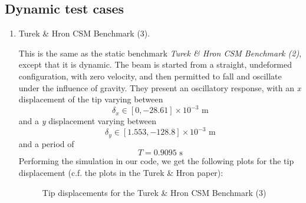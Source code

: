 \documentclass{article}
\begin{document}
\subsection{Dynamic test cases}
\begin{enumerate}
\item Turek \& Hron CSM Benchmark (3).

This is the same as the static benchmark \emph{Turek \& Hron CSM Benchmark (2)}, except that it is dynamic. 
The beam is started from a straight, undeformed configuration, with zero velocity, and then permitted to fall and oscillate under the influence of gravity.
They present an oscillatory response, with an \emph{x} displacement of the tip varying between
\[ \delta_x \in [0,-28.61] \times 10^{-3} \mbox{ m} \]
and a \emph{y} displacement varying between
\[ \delta_y \in [1.553,-128.8] \times 10^{-3} \mbox{ m} \]
and a period of
\[ T = 0.9095 \mbox{ s} \]
Performing the simulation in our code, we get the following plots for the tip displacement (c.f. the plots in the Turek \& Hron paper):
\begin{figure}[ht]
        \centering
        \caption{Tip displacements for the Turek \& Hron CSM Benchmark (3)}
\end{figure}


\end{enumerate}
\end{document}
